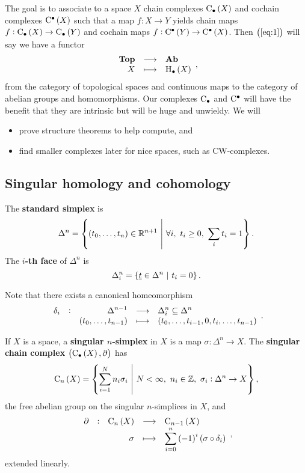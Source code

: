 \pagebreak

The goal is to associate to a space $ X $ chain complexes $ \C_\bullet\br{X} $ and cochain complexes $ \C^\bullet\br{X} $ such that a map $ f : X \to Y $ yields chain maps $ f : \C_\bullet\br{X} \to \C_\bullet\br{Y} $ and cochain maps $ f : \C^\bullet\br{Y} \to \C^\bullet\br{X} $. Then $ \br{\ref{eq:1}} $ will say we have a functor
$$ \function{\textbf{Top}}{\textbf{Ab}}{X}{\H_\bullet\br{X}}, $$
from the category of topological spaces and continuous maps to the category of abelian groups and homomorphisms. Our complexes $ \mathrm{C}_\bullet $ and $ \mathrm{C}^\bullet $ will have the benefit that they are intrinsic but will be huge and unwieldy. We will
\begin{itemize}
\item prove structure theorems to help compute, and
\item find smaller complexes later for nice spaces, such as CW-complexes.
\end{itemize}

\subsection{Singular homology and cohomology}

\begin{definition*}
The \textbf{standard simplex} is
$$ \Delta^n = \cbr{\br{t_0, \dots, t_n} \in \RR^{n + 1} \st \forall i, \ t_i \ge 0, \ \sum_i t_i = 1}. $$
The \textbf{$ i $-th face} of $ \Delta^n $ is
$$ \Delta_i^n = \cbr{\underline{t} \in \Delta^n \st t_i = 0}. $$
\end{definition*}

Note that there exists a canonical homeomorphism
$$ \function[\delta_i]{\Delta^{n - 1}}{\Delta_i^n \subseteq \Delta^n}{\br{t_0, \dots, t_{n - 1}}}{\br{t_0, \dots, t_{i - 1}, 0, t_i, \dots, t_{n - 1}}}. $$

\begin{definition*}
If $ X $ is a space, a \textbf{singular $ n $-simplex} in $ X $ is a map $ \sigma : \Delta^n \to X $. The \textbf{singular chain complex} $ \br{\C_\bullet\br{X}, \da} $ has
$$ \C_n\br{X} = \cbr{\sum_{i = 1}^N n_i\sigma_i \st N < \infty, \ n_i \in \ZZ, \ \sigma_i : \Delta^n \to X}, $$
the free abelian group on the singular $ n $-simplices in $ X $, and
$$ \function[\da]{\C_n\br{X}}{\C_{n - 1}\br{X}}{\sigma}{\sum_{i = 0}^n \br{-1}^i\br{\sigma \circ \delta_i}}, $$
extended linearly.
\end{definition*}

